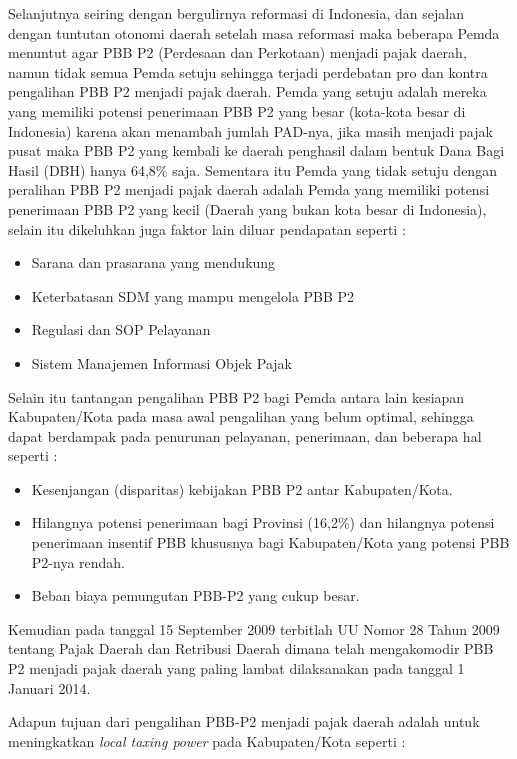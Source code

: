 \documentclass[pdftex, 12pt, oneside]{article}
\begin{document}
Selanjutnya seiring dengan bergulirnya reformasi di Indonesia, dan sejalan dengan tuntutan otonomi daerah setelah masa reformasi maka beberapa Pemda menuntut agar PBB P2 (Perdesaan dan Perkotaan) menjadi pajak daerah, namun tidak semua Pemda setuju sehingga terjadi perdebatan pro dan kontra pengalihan PBB P2 menjadi pajak daerah. Pemda yang setuju adalah mereka yang memiliki potensi penerimaan PBB P2 yang besar (kota-kota besar di Indonesia) karena akan menambah jumlah PAD-nya, jika masih menjadi pajak pusat maka PBB P2 yang kembali ke daerah penghasil dalam bentuk Dana Bagi Hasil (DBH) hanya 64,8\% saja. Sementara itu Pemda yang tidak setuju dengan peralihan PBB P2 menjadi pajak daerah adalah Pemda yang memiliki potensi penerimaan PBB P2 yang kecil (Daerah yang bukan kota besar di Indonesia), selain itu dikeluhkan juga faktor lain diluar pendapatan seperti :

\begin{itemize}
  \item Sarana dan prasarana yang mendukung
  \item Keterbatasan SDM yang mampu mengelola PBB P2
  \item Regulasi dan SOP Pelayanan
  \item Sistem Manajemen Informasi Objek Pajak
\end{itemize}

Selain itu tantangan pengalihan PBB P2 bagi Pemda antara lain kesiapan Kabupaten/Kota pada masa awal pengalihan yang belum optimal, sehingga dapat berdampak pada penurunan pelayanan, penerimaan, dan beberapa hal seperti :

\begin{itemize}
  \item Kesenjangan (disparitas) kebijakan PBB P2 antar Kabupaten/Kota.
  \item Hilangnya potensi penerimaan bagi Provinsi (16,2\%) dan hilangnya potensi penerimaan insentif PBB khususnya bagi Kabupaten/Kota yang potensi PBB P2-nya rendah.
  \item Beban biaya pemungutan PBB-P2 yang cukup besar.
\end{itemize}

Kemudian pada tanggal 15 September 2009 terbitlah UU Nomor 28 Tahun 2009 tentang Pajak Daerah dan Retribusi Daerah dimana telah mengakomodir PBB P2 menjadi pajak daerah yang paling lambat dilaksanakan pada tanggal 1 Januari 2014.

Adapun tujuan dari pengalihan PBB-P2 menjadi pajak daerah adalah untuk meningkatkan \textit{local taxing power} pada Kabupaten/Kota seperti : 
\end{document}
